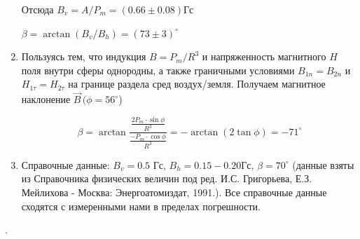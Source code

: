 \documentclass[a4paper, 12pt]{article}
\begin{document}
\begin{enumerate}
Отсюда $B_v = A/P_m = (0.66\pm0.08) $Гс

$\beta = \arctan (B_v/B_h) = (73\pm3)^\circ$

\item


 Пользуясь тем, что индукция $B= P_m/R^3$ и напряженность магнитного $H$ поля внутри сферы однородны, а также граничными условиями $B_{1n} = B_{2n}$ и $H_{1\tau} = H_{2\tau}$ на границе раздела сред воздух/земля. Получаем магнитное наклонение $\vec{B} \, (\phi = 56^\circ$)
 
   \begin{center}
\begin{equation}
\beta=\arctan \frac{\frac{2 P_{m} \cdot \sin \phi}{R^{3}}}{\frac{-P_{m} \cdot \cos \phi}{R^{3}}}=-\arctan (2 \tan \phi)=-71^{\circ}
\end{equation}
\end{center}

\item
Справочные данные: $B_v = 0.5$ Гс, $B_h = 0.15-0.20 Гс$, $\beta = 70^\circ$ (данные взяты из Справочника физических величин под ред. И.С. Григорьева, Е.З. Мейлихова - Москва: Энергоатомиздат, 1991.). Все справочные данные сходятся с измеренными нами в пределах погрешности.


 \end{enumerate}. 
\end{document}
